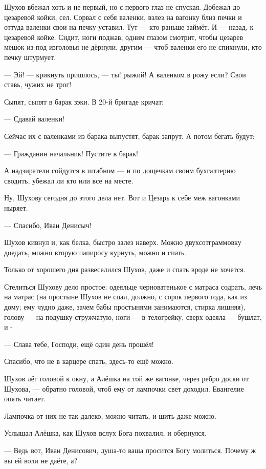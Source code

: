 Шухов вбежал хоть и не первый, но с первого глаз не спуская. Добежал до цезаревой койки, сел. Сорвал с себя валенки, взлез на вагонку близ печки и оттуда валенки свои на печку уставил. Тут --- кто раньше займёт. И --- назад, к цезаревой койке. Сидит, ноги поджав, одним глазом смотрит, чтобы цезарев мешок из-под изголовья не дёрнули, другим --- чтоб валенки его не спихнули, кто печку штурмует.

--- Эй! --- крикнуть пришлось, --- ты! рыжий! А валенком в рожу если? Свои ставь, чужих не трог!

Сыпят, сыпят в барак зэки. В 20-й бригаде кричат:

--- Сдавай валенки!

Сейчас их с валенками из барака выпустят, барак запрут. А потом бегать будут:

--- Гражданин начальник! Пустите в барак!

А надзиратели сойдутся в штабном --- и по дощечкам своим бухгалтерию сводить, убежал ли кто или все на месте.

Ну, Шухову сегодня до этого дела нет. Вот и Цезарь к себе меж вагонками ныряет.

--- Спасибо, Иван Денисыч!

Шухов кивнул и, как белка, быстро залез наверх. Можно двухсотграммовку доедать, можно вторую папиросу курнуть, можно и спать.

Только от хорошего дня развеселился Шухов, даже и спать вроде не хочется.

Стелиться Шухову дело простое: одеяльце черноватенькое с матраса содрать, лечь на матрас (на простыне Шухов не спал, должно, с сорок первого года, как из дому; ему чудно даже, зачем бабы простынями занимаются, стирка лишняя), голову --- на подушку стружчатую, ноги --- в телогрейку, сверх одеяла --- бушлат, и -

--- Слава тебе, Господи, ещё один день прошёл!

Спасибо, что не в карцере спать, здесь-то ещё можно.

Шухов лёг головой к окну, а Алёшка на той же вагонке, через ребро доски от Шухова, --- обратно головой, чтоб ему от лампочки свет доходил. Евангелие опять читает.

Лампочка от них не так далеко, можно читать, и шить даже можно.

Услышал Алёшка, как Шухов вслух Бога похвалил, и обернулся.

--- Ведь вот, Иван Денисович, душа-то ваша просится Богу молиться. Почему ж вы ей воли не даёте, а?


